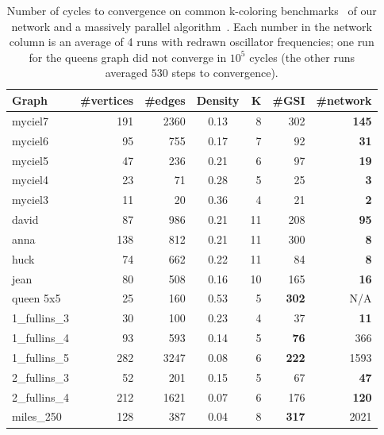 \documentclass[10pt]{article}
\begin{document}
\begin{table}
\centering
\begin{tabular}{l r r c r r r }
\toprule
Graph & \#vertices & \#edges & Density & K & \#GSI & \#network \\
\midrule
myciel7 & 191 & 2360 & 0.13 & 8 & 302 & \textbf{145} \\
myciel6 & 95 & 755 & 0.17 & 7 & 92 & \textbf{31} \\
myciel5 & 47 & 236 & 0.21 & 6 &  97 & \textbf{19} \\
myciel4 & 23 & 71 & 0.28 & 5 & 25 & \textbf{3} \\
myciel3 & 11 & 20 & 0.36 & 4 &   21 & \textbf{2} \\
david & 87 & 986 & 0.21 & 11 & 208 & \textbf{95} \\
anna & 138 & 812 & 0.21 & 11 & 300 & \textbf{8} \\
huck &74 & 662 & 0.22 & 11 & 84 & \textbf{8} \\
jean & 80 & 508 & 0.16 & 10 & 165 & \textbf{16} \\
queen 5x5 & 25 & 160 & 0.53 & 5 & \textbf{302} & N/A \\ 
1\_fullins\_3 & 30 & 100 & 0.23 & 4 & 37 & \textbf{11} \\
1\_fullins\_4 & 93 & 593 & 0.14 & 5 & \textbf{76} & 366 \\
1\_fullins\_5 & 282 & 3247 & 0.08 & 6 & \textbf{222} & 1593 \\
2\_fullins\_3 & 52 & 201 & 0.15 & 5 & 67 & \textbf{47} \\
2\_fullins\_4 & 212 & 1621 & 0.07 & 6 & 176 & \textbf{120} \\
miles\_250 & 128 & 387 & 0.04 & 8 & \textbf{317} & 2021 \\
\bottomrule
\end{tabular}
\caption{Number of cycles to convergence on common k-coloring benchmarks~\cite{Ruiz_Romay11} of our network and a massively parallel algorithm~\cite{Ruiz_Romay11}. Each number in the network column is an average of 4 runs with redrawn oscillator frequencies; one run for the queens graph did not converge in $10^5$ cycles (the other runs averaged $530$ steps to convergence).}
\label{tab:kcol}
\end{table}
\end{document}
